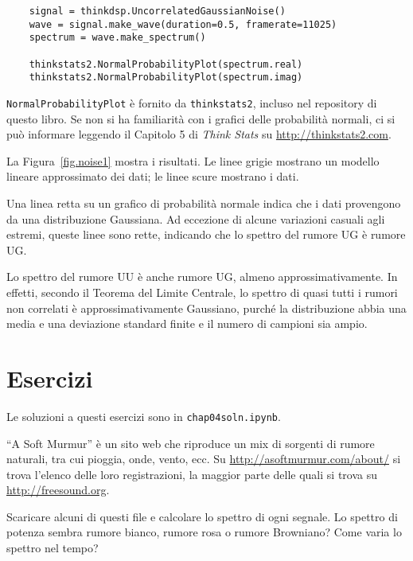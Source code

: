 \documentclass[12pt,a4paper]{book}
\begin{document}
\begin{verbatim} 
    signal = thinkdsp.UncorrelatedGaussianNoise()
    wave = signal.make_wave(duration=0.5, framerate=11025)
    spectrum = wave.make_spectrum()

    thinkstats2.NormalProbabilityPlot(spectrum.real)
    thinkstats2.NormalProbabilityPlot(spectrum.imag)
 \end{verbatim} 

{\tt NormalProbabilityPlot} è fornito da {\tt thinkstats2}, incluso nel repository di questo libro. Se non si ha familiarità con i grafici delle probabilità normali, ci si può informare leggendo il Capitolo 5 di {\it Think Stats} su \url{http://thinkstats2.com}.

La Figura~\ref{fig.noise1} mostra i risultati. Le linee grigie mostrano un modello lineare approssimato dei dati; le linee scure mostrano i dati.

Una linea retta su un grafico di probabilità normale indica che i dati provengono da una distribuzione Gaussiana. Ad eccezione di alcune variazioni casuali agli estremi, queste linee sono rette, indicando che lo spettro del rumore UG è rumore UG.

Lo spettro del rumore UU è anche rumore UG, almeno approssimativamente. In effetti, secondo il Teorema del Limite Centrale, lo spettro di quasi tutti i rumori non correlati è approssimativamente Gaussiano, purché la distribuzione abbia una media e una deviazione standard finite e il numero di campioni sia ampio.

\section{Esercizi} 

Le soluzioni a questi esercizi sono in {\tt chap04soln.ipynb}.

\begin{exercise} ``A Soft Murmur'' è un sito web che riproduce un mix di sorgenti di rumore naturali, tra cui pioggia, onde, vento, ecc. Su \url{http://asoftmurmur.com/about/} si trova l'elenco delle loro registrazioni, la maggior parte delle quali si trova su \url{http://freesound.org}.

Scaricare alcuni di questi file e calcolare lo spettro di ogni segnale. Lo spettro di potenza sembra rumore bianco, rumore rosa o rumore Browniano? Come varia lo spettro nel tempo? \end{exercise} 
\end{document}
